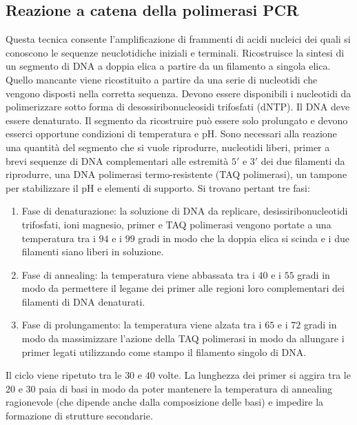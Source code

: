\subsection{Reazione a catena della polimerasi PCR}
Questa tecnica consente l'amplificazione di frammenti di acidi nucleici dei quali si conoscono le sequenze neuclotidiche iniziali e terminali. Ricostruisce la sintesi di un segmento di 
DNA a doppia elica a partire da un filamento a singola elica. Quello mancante viene ricostituito a partire da una serie di nucleotidi che vengono disposti nella corretta sequenza. 
Devono essere disponibili i nucleotidi da polimerizzare sotto forma di desossiribonucleosidi trifosfati (dNTP). Il DNA deve essere denaturato. Il segmento da ricostruire pu\`o essere 
solo prolungato e devono esserci opportune condizioni di temperatura e pH. Sono necessari alla reazione una quantit\`a del segmento che si vuole riprodurre, nucleotidi liberi, primer 
a brevi sequenze di DNA complementari alle estremit\`a $5'$ e $3'$ dei due filamenti da riprodurre, una DNA polimerasi termo-resistente (TAQ polimerasi), un tampone per stabilizzare il 
pH e elementi di supporto. Si trovano pertant tre fasi: 
\begin{enumerate}
	\item Fase di denaturazione: la soluzione di DNA da replicare, desissiribonucleotidi trifosfati, ioni magnesio, primer e TAQ polimerasi vengono portate a una temperatura tra i 
		$94$ e i $99$ gradi in modo che la doppia elica si scinda e i due filamenti siano liberi in soluzione.
	\item Fase di annealing: la temperatura viene abbassata tra i $40$ e i $55$ gradi in modo da permettere il legame dei primer alle regioni loro complementari dei filamenti di DNA 
		denaturati.
	\item Fase di prolungamento: la temperatura viene alzata tra i $65$ e i $72$ gradi in modo da massimizzare l'azione della TAQ polimerasi in modo da allungare i primer legati 
		utilizzando come stampo il filamento singolo di DNA.
\end{enumerate}
Il ciclo viene ripetuto tra le $30$ e $40$ volte. La lunghezza dei primer si aggira tra le $20$ e $30$ paia di basi in modo da poter mantenere la temperatura di annealing ragionevole
(che dipende anche dalla composizione delle basi) e  impedire la formazione di strutture secondarie.
